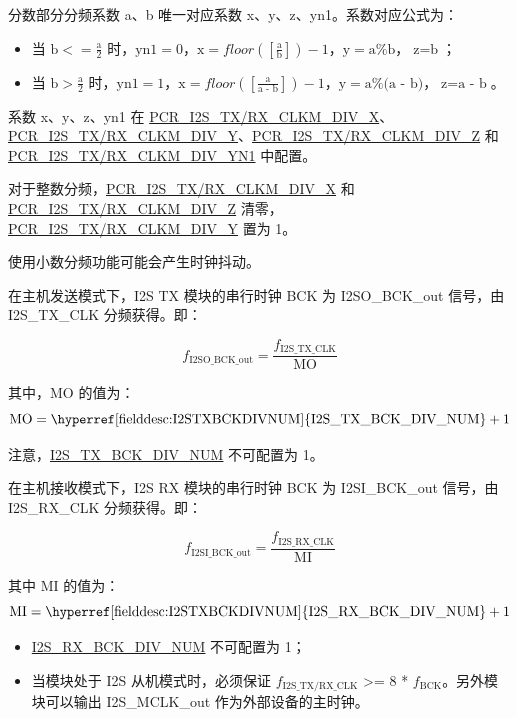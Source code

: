 \documentclass[main\_\_CN.tex]{subfiles}
\begin{document}
分数部分分频系数 a、b 唯一对应系数 x、y、z、yn1。系数对应公式为：

\begin{itemize}
    \item 当 $\textrm{b} <= \frac{\textrm{a}}{2}$ 时，$\textrm{yn1} = 0$，$\textrm{x} = floor([\frac{\textrm{a}}{\textrm{b}}]) - 1$，$\textrm{y} = \textrm{a}\%\textrm{b}$，$\textrm{z} = \textrm{b}$；
    \item 当 $\textrm{b} > \frac{\textrm{a}}{2}$ 时，$\textrm{yn1}=1$，$\textrm{x} = floor([\frac{\textrm{a}}{\textrm{a - b}}]) - 1$，$\textrm{y} = \textrm{a}\%\textrm{(a - b)}$，$\textrm{z}=\textrm{a - b}$。
\end{itemize}

系数 x、y、z、yn1 在  \hyperref[fielddesc:PCRI2STXCLKMDIVX]{PCR\_I2S\_TX/RX\_CLKM\_DIV\_X}、\hyperref[fielddesc:PCRI2STXCLKMDIVY]{PCR\_I2S\_TX/RX\_CLKM\_DIV\_Y}、\hyperref[fielddesc:PCRI2STXCLKMDIVZ]{PCR\_I2S\_TX/RX\_CLKM\_DIV\_Z} 和 \hyperref[fielddesc:PCRI2STXCLKMDIVYN1]{PCR\_I2S\_TX/RX\_CLKM\_DIV\_YN1} 中配置。 

对于整数分频，\hyperref[fielddesc:PCRI2STXCLKMDIVX]{PCR\_I2S\_TX/RX\_CLKM\_DIV\_X} 和 \hyperref[fielddesc:PCRI2STXCLKMDIVZ]{PCR\_I2S\_TX/RX\_CLKM\_DIV\_Z} 清零，\hyperref[fielddesc:PCRI2STXCLKMDIVY]{PCR\_I2S\_TX/RX\_CLKM\_DIV\_Y} 置为 1。

\begin{tiplisting}
使用小数分频功能可能会产生时钟抖动。
\end{tiplisting}

在主机发送模式下，I2S TX 模块的串行时钟 BCK 为 I2SO\_BCK\_out 信号，由 I2S\_TX\_CLK 分频获得。即：

$$f_{\textrm{I2SO\_BCK\_out}} = \frac{f_{\textrm{I2S\_TX\_CLK}}}{\textrm{MO}}$$

其中，MO 的值为：
$$ \textrm{MO} = \textrm{\hyperref[fielddesc:I2STXBCKDIVNUM]{I2S\_TX\_BCK\_DIV\_NUM}} + 1 $$

\vspace{-1em}
\begin{tiplisting}
注意，\hyperref[fielddesc:I2STXBCKDIVNUM]{I2S\_TX\_BCK\_DIV\_NUM} 不可配置为 1。
\end{tiplisting}

在主机接收模式下，I2S RX 模块的串行时钟 BCK 为 I2SI\_BCK\_out 信号，由 I2S\_RX\_CLK 分频获得。即：

$$f_{\textrm{I2SI\_BCK\_out}} = \frac{f_{\textrm{I2S\_RX\_CLK}}}{\textrm{MI}}$$

其中 MI 的值为：
$$ \textrm{MI} = \textrm{\hyperref[fielddesc:I2STXBCKDIVNUM]{I2S\_RX\_BCK\_DIV\_NUM}} + 1 $$
\begin{tiplisting}
\vspace{-2em}
\begin{itemize}
    \item \hyperref[fielddesc:I2SRXBCKDIVNUM]{I2S\_RX\_BCK\_DIV\_NUM} 不可配置为 1；
    \item 当模块处于 I2S 从机模式时，必须保证 $f_{\textrm{I2S\_TX/RX\_CLK}}$ >= 8 * $f_{\textrm{BCK}}$。另外模块可以输出 I2S\_MCLK\_out 作为外部设备的主时钟。
\end{itemize}
\end{tiplisting}
\end{document}

